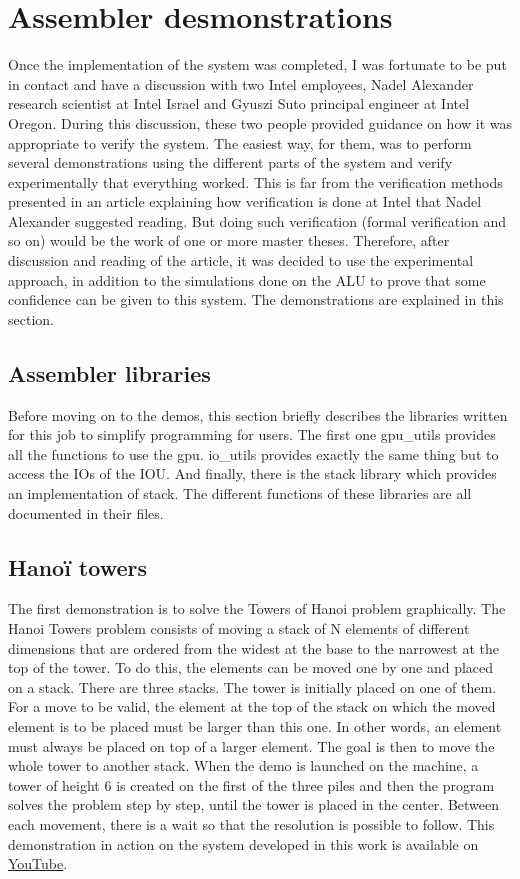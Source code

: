 \section{Assembler desmonstrations}

Once the implementation of the system was completed, I was fortunate to be put in contact and have 
a discussion with two Intel employees, Nadel Alexander research scientist at Intel Israel and 
Gyuszi Suto principal engineer at Intel Oregon. During this discussion, these two people provided 
guidance on how it was appropriate to verify the system. The easiest way, for them, was to perform 
several demonstrations using the different parts of the system and verify experimentally that 
everything worked. This is far from the verification methods presented in an article 
explaining how verification is done at Intel that Nadel Alexander suggested reading. But doing such 
verification (formal verification and so on) would be the work of one or more master theses. 
Therefore, after discussion and reading of the article, it was decided to use the experimental 
approach, in addition to the simulations done on the ALU to prove that some confidence can be given 
to this system. The demonstrations are explained in this section.

\subsection{Assembler libraries}

Before moving on to the demos, this section briefly describes the libraries written for this job to 
simplify programming for users. The first one gpu\_utils provides all the functions to use the gpu. 
io\_utils provides exactly the same thing but to access the IOs of the IOU. And finally, there is 
the stack library which provides an implementation of stack. The different functions of these 
libraries are all documented in their files.

\subsection{Hanoï towers}

The first demonstration is to solve the Towers of Hanoi problem graphically. The Hanoi Towers 
problem consists of moving a stack of N elements of different dimensions that are ordered from the 
widest at the base to the narrowest at the top of the tower. To do this, the elements can be moved 
one by one and placed on a stack. There are three stacks. The tower is initially placed on one of 
them. For a move to be valid, the element at the top of the stack on which the moved element is to 
be placed must be larger than this one. In other words, an element must always be placed on top of 
a larger element. The goal is then to move the whole tower to another stack. When the demo is 
launched on the machine, a tower of height 6 is created on the first of the three piles and then 
the program solves the problem step by step, until the tower is placed in the center. Between each 
movement, there is a wait so that the resolution is possible to follow. This demonstration in 
action on the system developed in this work is available on 
\href{https://www.youtube.com/watch?v=0W0SXzncl-Q}{YouTube}.

